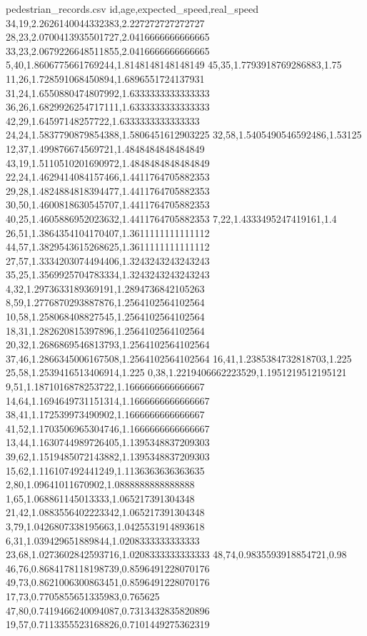 \begin{filecontents*}{pedestrian_records.csv}
id,age,expected_speed,real_speed
34,19,2.2626140044332383,2.227272727272727
28,23,2.0700413935501727,2.0416666666666665
33,23,2.0679226648511855,2.0416666666666665
5,40,1.8606775661769244,1.8148148148148149
45,35,1.7793918769286883,1.75
11,26,1.728591068450894,1.6896551724137931
31,24,1.6550880474807992,1.6333333333333333
36,26,1.6829926254717111,1.6333333333333333
42,29,1.64597148257722,1.6333333333333333
24,24,1.5837790879854388,1.5806451612903225
32,58,1.5405490546592486,1.53125
12,37,1.499876674569721,1.4848484848484849
43,19,1.5110510201690972,1.4848484848484849
22,24,1.4629414084157466,1.4411764705882353
29,28,1.4824884818394477,1.4411764705882353
30,50,1.4600818630545707,1.4411764705882353
40,25,1.4605886952023632,1.4411764705882353
7,22,1.4333495247419161,1.4
26,51,1.3864354104170407,1.3611111111111112
44,57,1.3829543615268625,1.3611111111111112
27,57,1.3334203074494406,1.3243243243243243
35,25,1.3569925704783334,1.3243243243243243
4,32,1.2973633189369191,1.2894736842105263
8,59,1.2776870293887876,1.2564102564102564
10,58,1.258068408827545,1.2564102564102564
18,31,1.282620815397896,1.2564102564102564
20,32,1.2686869546813793,1.2564102564102564
37,46,1.2866345006167508,1.2564102564102564
16,41,1.2385384732818703,1.225
25,58,1.2539416513406914,1.225
0,38,1.2219406662223529,1.1951219512195121
9,51,1.1871016878253722,1.1666666666666667
14,64,1.1694649731151314,1.1666666666666667
38,41,1.172539973490902,1.1666666666666667
41,52,1.1703506965304746,1.1666666666666667
13,44,1.1630744989726405,1.1395348837209303
39,62,1.1519485072143882,1.1395348837209303
15,62,1.116107492441249,1.1136363636363635
2,80,1.09641011670902,1.0888888888888888
1,65,1.068861145013333,1.065217391304348
21,42,1.0883556402223342,1.065217391304348
3,79,1.0426807338195663,1.0425531914893618
6,31,1.039429651889844,1.0208333333333333
23,68,1.0273602842593716,1.0208333333333333
48,74,0.9835593918854721,0.98
46,76,0.8684178118198739,0.8596491228070176
49,73,0.8621006300863451,0.8596491228070176
17,73,0.7705855651335983,0.765625
47,80,0.7419466240094087,0.7313432835820896
19,57,0.7113355523168826,0.7101449275362319
\end{filecontents*}